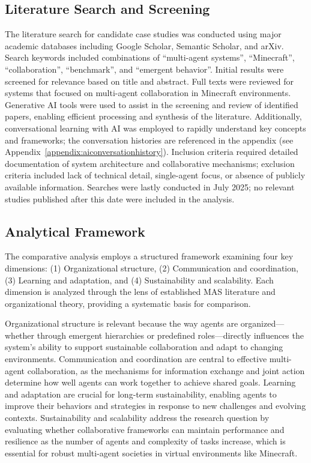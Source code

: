\documentclass[a4paper, 12pt]{article}
\begin{document}
\subsection{Literature Search and Screening}

The literature search for candidate case studies was conducted using major academic databases including Google Scholar, Semantic Scholar, and arXiv. Search keywords included combinations of ``multi-agent systems'', ``Minecraft'', ``collaboration'', ``benchmark'', and ``emergent behavior''. Initial results were screened for relevance based on title and abstract. Full texts were reviewed for systems that focused on multi-agent collaboration in Minecraft environments. Generative AI tools were used to assist in the screening and review of identified papers, enabling efficient processing and synthesis of the literature. Additionally, conversational learning with AI was employed to rapidly understand key concepts and frameworks; the conversation histories are referenced in the appendix (see Appendix~\ref{appendix:aiconversationhistory}). Inclusion criteria required detailed documentation of system architecture and collaborative mechanisms; exclusion criteria included lack of technical detail, single-agent focus, or absence of publicly available information. Searches were lastly conducted in July 2025; no relevant studies published after this date were included in the analysis.

\subsection{Analytical Framework}

The comparative analysis employs a structured framework examining four key dimensions: (1) Organizational structure, (2) Communication and coordination, (3) Learning and adaptation, and (4) Sustainability and scalability. Each dimension is analyzed through the lens of established MAS literature and organizational theory, providing a systematic basis for comparison.

Organizational structure is relevant because the way agents are organized---whether through emergent hierarchies or predefined roles---directly influences the system's ability to support sustainable collaboration and adapt to changing environments. Communication and coordination are central to effective multi-agent collaboration, as the mechanisms for information exchange and joint action determine how well agents can work together to achieve shared goals. Learning and adaptation are crucial for long-term sustainability, enabling agents to improve their behaviors and strategies in response to new challenges and evolving contexts. Sustainability and scalability address the research question by evaluating whether collaborative frameworks can maintain performance and resilience as the number of agents and complexity of tasks increase, which is essential for robust multi-agent societies in virtual environments like Minecraft.
\end{document}
